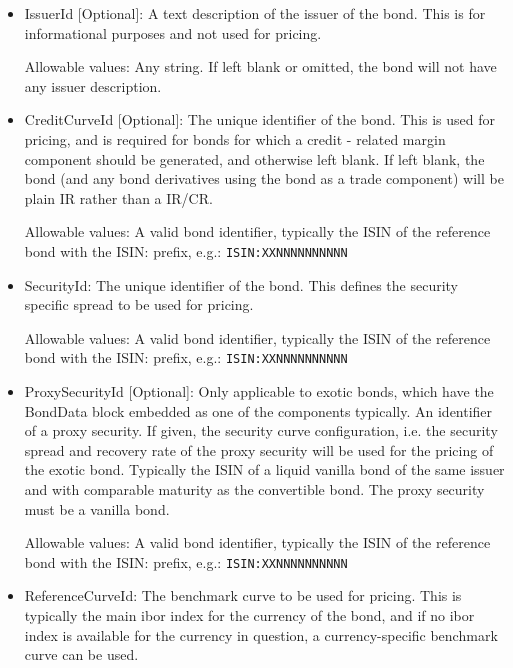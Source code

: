 \begin{itemize}
\item IssuerId [Optional]: A text description of the issuer of the bond.  This is for informational purposes and not used for pricing.

Allowable values: Any string. If left blank or omitted, the bond will not have any issuer description.

\item CreditCurveId [Optional]: The unique identifier of the bond. This is used for pricing, and is required for bonds for which a credit - related margin component should be generated, and otherwise left blank. If left blank, the bond (and any bond derivatives using the bond as a trade component) will be  plain IR rather than a IR/CR. 

Allowable values: A valid bond identifier, typically the ISIN of the reference bond with the ISIN: prefix, e.g.: \verb+ISIN:XXNNNNNNNNNN+

\item SecurityId: The unique identifier of the bond.  This defines the security specific spread to be used for pricing.

Allowable values: A valid bond identifier, typically the ISIN of the reference bond with the ISIN: prefix, e.g.: \verb+ISIN:XXNNNNNNNNNN+

\item ProxySecurityId [Optional]: Only applicable to exotic bonds, which have the BondData block embedded as one of the
  components typically. An identifier of a proxy security. If given, the security curve configuration, i.e. the security
  spread and recovery rate of the proxy security will be used for the pricing of the exotic bond. Typically the ISIN of
  a liquid vanilla bond of the same issuer and with comparable maturity as the convertible bond. The proxy security must
  be a vanilla bond.
  
  Allowable values: A valid bond identifier, typically the ISIN of the reference bond with the ISIN: prefix, e.g.: \verb+ISIN:XXNNNNNNNNNN+
  
\item ReferenceCurveId: The benchmark curve to be used for pricing. This is typically the main ibor index for the currency of the bond, and if no ibor index is available for the currency in question, a currency-specific benchmark curve can be used.


\end{itemize}

